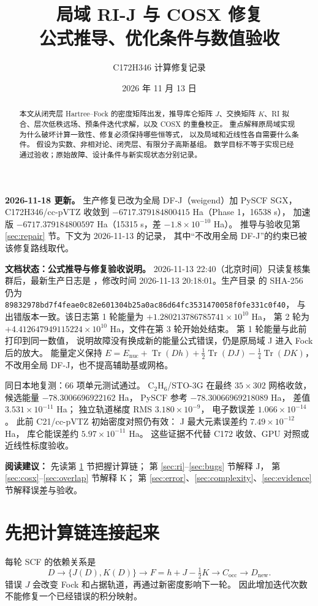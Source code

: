 \documentclass[UTF8,fontset=fandol,11pt,a4paper]{ctexart}
\title{局域 RI-J 与 COSX 修复\\公式推导、优化条件与数值验收}
\author{C172H346 计算修复记录}
\date{2026 年 11 月 13 日}
\numberwithin{equation}{section}
\newcommand{\Tr}{\operatorname{Tr}}
\newcommand{\code}[1]{\texttt{\detokenize{#1}}}
\begin{document}
\maketitle
\noindent\textbf{2026-11-18 更新。}
生产修复已改为全局 DF-J（weigend）加 PySCF SGX，
C172H346/cc-pVTZ 收敛到 \(-6717.379184800415\) Ha（Phase 1，16538 s），
加速版 \(-6717.379184800597\) Ha（15315 s，差 \(-1.8\times10^{-10}\) Ha）。
推导与验收见第 \ref{sec:repair} 节。下文为 2026-11-13 的记录，
其中“不改用全局 DF-J”的约束已被该修复路线取代。

\medskip
\noindent\textbf{文档状态：公式推导与修复验收说明。}
2026-11-13 22:40（北京时间）只读复核集群后，最新生产日志是
，修改时间
2026-11-13 20:18:01。生产目录 \code{hf.py} 的 SHA-256 仍为
\texttt{89832978bd7f4feae0c82e601304b25a0ac86d64fc3531470058f0fe331c0f40}，
与出错版本一致。该日志第 1 轮能量为 \(+1.280213786785741\times10^{10}\) Ha，
第 2 轮为 \(+4.412647949115224\times10^{10}\) Ha，文件在第 3 轮开始处结束。
第 1 轮能量与此前 \code{c172h346\_ccpvtz\_4} 打印到同一数值，
说明故障没有换成新的能量公式错误，仍是原局域 J 进入 Fock 后的放大。
能量定义保持
\(E=E_{\mathrm{nuc}}+\Tr(Dh)+\frac12\Tr(DJ)-\frac14\Tr(DK)\)，
不改用全局 DF-J，也不提高辅助基或网格。

同日本地复测：66 项单元测试通过。
C\(_2\)H\(_6\)/STO-3G 在最终 \(35\times302\) 网格收敛，
候选能量 \(-78.3006696922162\) Ha，
PySCF 参考 \(-78.30066969218089\) Ha，
差值 \(3.531\times10^{-11}\) Ha；
独立轨道梯度 RMS \(3.180\times10^{-9}\)，
电子数误差 \(1.066\times10^{-14}\)。
此前 C21/cc-pVTZ 初始密度对照仍有效：
J 最大元素误差约 \(7.49\times10^{-12}\) Ha，
库仑能误差约 \(5.97\times10^{-11}\) Ha。
这些证据不代替 C172 收敛、GPU 对照或近线性标度验收。

\medskip
\noindent\textbf{阅读建议：}
先读第 \ref{sec:roadmap} 节把握计算链；
第 \ref{sec:ri}--\ref{sec:bugs} 节解释 J，
第 \ref{sec:cosx}--\ref{sec:overlap} 节解释 K；
第 \ref{sec:error}、\ref{sec:complexity}、\ref{sec:evidence} 节解释误差与验收。
\begin{abstract}
本文从闭壳层 Hartree--Fock 的密度矩阵出发，推导库仑矩阵 \(J\)、交换矩阵
\(K\)、RI 拟合、层次低秩远场、预条件迭代求解，以及 COSX 的重叠校正。
重点解释原局域实现为什么破坏计算一致性、修复必须保持哪些恒等式，
以及局域和近线性各自需要什么条件。
假设为实数、非相对论、闭壳层、有限分子高斯基组。
数学目标不等于实现已经通过验收；原始故障、设计条件与新实现状态分别记录。
\end{abstract}
\tableofcontents
\newpage

\section{先把计算链连接起来}
\label{sec:roadmap}
每轮 SCF 的依赖关系是
\begin{equation}
D\longrightarrow\{J(D),K(D)\}\longrightarrow F=h+J-\tfrac12K
\longrightarrow C_{\mathrm{occ}}\longrightarrow D_{\mathrm{new}}.
\label{eq:flow}
\end{equation}
错误 \(J\) 会改变 Fock 和占据轨道，再通过新密度影响下一轮。
因此增加迭代次数不能修复一个已经错误的积分映射。
\end{document}
